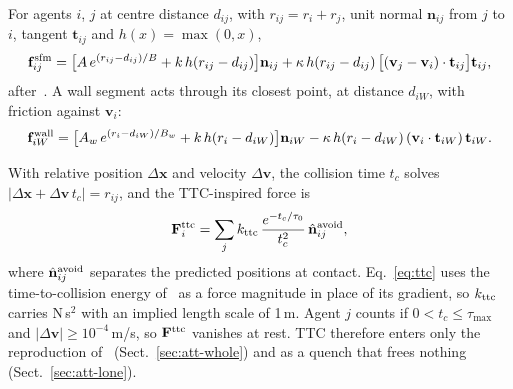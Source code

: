 For agents $i$, $j$ at centre distance $d_{ij}$, with $r_{ij}=r_i+r_j$, unit normal $\mathbf n_{ij}$ from $j$ to $i$, tangent $\mathbf t_{ij}$ and $h(x)=\max(0,x)$,
\begin{equation}\label{eq:sfm}
\mathbf f^{\rm sfm}_{ij}=\bigl[A\,e^{(r_{ij}-d_{ij})/B}+k\,h(r_{ij}-d_{ij})\bigr]\mathbf n_{ij}+\kappa\,h(r_{ij}-d_{ij})\,\bigl[(\mathbf v_j-\mathbf v_i)\cdot\mathbf t_{ij}\bigr]\mathbf t_{ij},
\end{equation}
after~\cite{helbing2000nature}. A wall segment acts through its closest point, at distance $d_{iW}$, with friction against $\mathbf v_i$:
\begin{equation}\label{eq:wall}
\mathbf f^{\rm wall}_{iW}=\bigl[A_w\,e^{(r_i-d_{iW})/B_w}+k\,h(r_i-d_{iW})\bigr]\mathbf n_{iW}-\kappa\,h(r_i-d_{iW})\,(\mathbf v_i\cdot\mathbf t_{iW})\,\mathbf t_{iW}.
\end{equation}

With relative position $\Delta\mathbf x$ and velocity $\Delta\mathbf v$, the collision time $t_c$ solves $|\Delta\mathbf x+\Delta\mathbf v\,t_c|=r_{ij}$, and the TTC-inspired force is
\begin{equation}\label{eq:ttc}
\mathbf F^{\rm ttc}_i=\sum_j k_{\rm ttc}\,\frac{e^{-t_c/\tau_0}}{t_c^2}\,\hat{\mathbf n}^{\rm avoid}_{ij},
\end{equation}
where $\hat{\mathbf n}^{\rm avoid}_{ij}$ separates the predicted positions at contact. Eq.~\eqref{eq:ttc} uses the time-to-collision energy of~\cite{karamouzas2014} as a force magnitude in place of its gradient, so $k_{\rm ttc}$ carries N\,s$^2$ with an implied length scale of 1\,m. Agent $j$ counts if $0<t_c\le\tau_{\max}$ and $|\Delta\mathbf v|\ge10^{-4}$\,m/s, so $\mathbf F^{\rm ttc}$ vanishes at rest. TTC therefore enters only the reproduction of~\cite{gang2026} (Sect.~\ref{sec:att-whole}) and as a quench that frees nothing (Sect.~\ref{sec:att-lone}).

